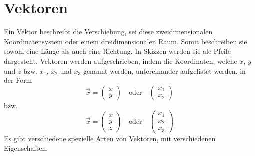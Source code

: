 \documentclass{article}
\begin{document}
 
\newcommand{\norm}[1]{\left| {#1} \right|}  
\newcommand{\vect}[1]{\overrightarrow{#1}} 
 
\section{Vektoren}
Ein Vektor beschreibt die Verschiebung, sei diese zweidimensionalen Koordinatensystem oder einem dreidimensionalen Raum. Somit beschreiben sie sowohl eine Länge als auch eine Richtung. In Skizzen werden sie ale Pfeile dargestellt. Vektoren werden aufgeschrieben, indem die Koordinaten, welche $x$, $y$ und $z$ bzw. $x_1$, $x_2$ und $x_3$ genannt werden, untereinander aufgelistet werden, in der Form 
\[
 \vect{x} = \begin{pmatrix} x \\ y \end{pmatrix}
 \quad \text{oder} \quad
 \begin{pmatrix} x_1 \\ x_2 \end{pmatrix}
\]
bzw. 
\[
 \vect{x} = \begin{pmatrix} x \\ y \\ z \end{pmatrix}
 \quad \text{oder} \quad
 \begin{pmatrix} x_1 \\ x_2 \\ x_3 \end{pmatrix}
\] 
Es gibt verschiedene spezielle Arten von Vektoren, mit verschiedenen Eigenschaften. 
 
\end{document}
